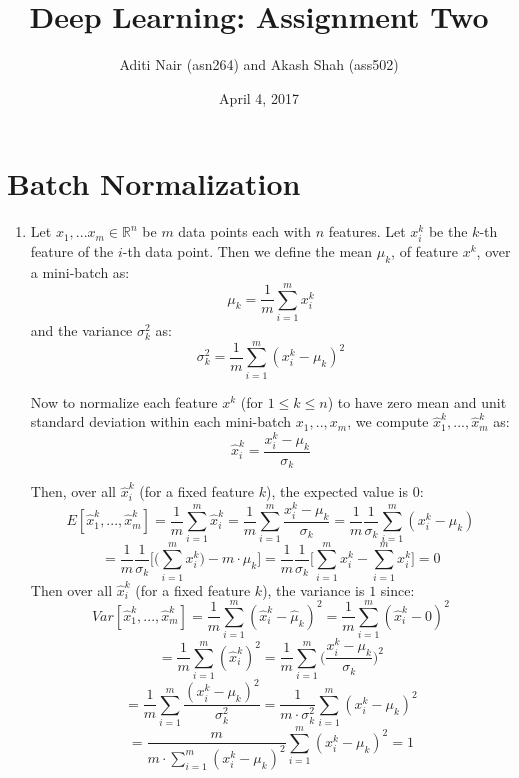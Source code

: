 \documentclass[a4paper]{article}
\title{Deep Learning: Assignment Two}
\author{Aditi Nair (asn264) and Akash Shah (ass502)}
\date{April 4, 2017}
\begin{document}
\maketitle

\section{Batch Normalization}

\begin{enumerate}
\item{Let $x_1,...x_m \in \mathbb{R}^n$ be $m$ data points each with $n$ features. Let $x_i^k$ be the $k$-th feature of the $i$-th data point. Then we define the mean $\mu_k$, of feature $x^k$, over a mini-batch as:
$$ \mu_k = \frac{1}{m} \sum_{i=1}^m x_i^k$$
and the variance $\sigma_k^2$ as:
$$ \sigma_k^2 = \frac{1}{m} \sum_{i=1}^m (x_i^k - \mu_k)^2$$

Now to normalize each feature $x^k$ (for $ 1 \leq k \leq n$) to have zero mean and unit standard deviation within each mini-batch $x_1,..,x_m$, we compute $\hat{x}_1^k, ..., \hat{x}_m^k$ as: 
$$\hat{x}_i^k = \frac{x_i^k - \mu_k}{\sigma_k}$$

Then, over all $\hat{x}_i^k$ (for a fixed feature $k$), the expected value is $0$:
$$E[\hat{x}_1^k,...,\hat{x}_m^k] = \frac{1}{m} \sum_{i=1}^m \hat{x}_i^k = \frac{1}{m} \sum_{i=1}^m \frac{x_i^k - \mu_k}{\sigma_k} 
= \frac{1}{m} \frac{1}{\sigma_k} \sum_{i=1}^m (x_i^k - \mu_k) $$
$$ =  \frac{1}{m} \frac{1}{\sigma_k}  \Bigg[ \Bigg( \sum_{i=1}^m x_i^k \Bigg) - m \cdot \mu_k    \Bigg]
=  \frac{1}{m} \frac{1}{\sigma_k}  \Bigg[ \sum_{i=1}^m x_i^k  - \sum_{i=1}^m x_i^k  \Bigg] = 0$$
\newline
\newline
Then over all $\hat{x}_i^k$ (for a fixed feature $k$), the variance is $1$ since:
$$Var[\hat{x}_1^k,...,\hat{x}_m^k] = \frac{1}{m}\sum_{i=1}^m (\hat{x}_i^k - \hat{\mu}_k)^2 = \frac{1}{m}\sum_{i=1}^m (\hat{x}_i^k - 0)^2 $$
$$ = \frac{1}{m}\sum_{i=1}^m (\hat{x}_i^k)^2 
=  \frac{1}{m}\sum_{i=1}^m \Big( \frac{x_i^k- \mu_k}{\sigma_k} \Big)^2 $$
$$ = \frac{1}{m}\sum_{i=1}^m  \frac{(x_i^k - \mu_k)^2}{\sigma_k^2} = \frac{1}{m \cdot \sigma_k^2} \sum_{i=1}^m  (x_i^k - \mu_k)^2$$
$$
= \frac{m}{m \cdot \sum_{i=1}^m (x_i^k - \mu_k)^2}  \sum_{i=1}^m  (x_i^k - \mu_k)^2 = 1
$$}


\end{enumerate}
\end{document}
